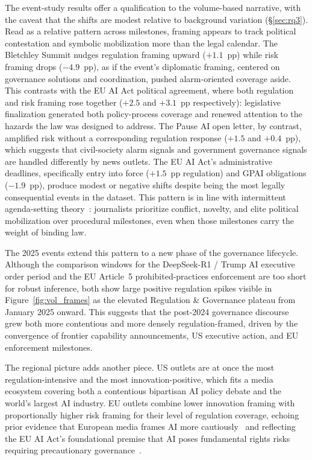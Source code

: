 \documentclass[sigconf]{acmart}
\begin{document}
The event-study results offer a qualification to the volume-based narrative, with the caveat that the shifts are modest relative to background variation (\S\ref{sec:rq3}).
Read as a relative pattern across milestones, framing appears to track political contestation and symbolic mobilization more than the legal calendar.
The Bletchley Summit nudges regulation framing upward ($+1.1$~pp) while risk framing drops ($-4.9$~pp), as if the event's diplomatic framing, centered on governance solutions and coordination, pushed alarm-oriented coverage aside.
This contrasts with the EU AI Act political agreement, where both regulation and risk framing rose together ($+2.5$ and $+3.1$~pp respectively): legislative finalization generated both policy-process coverage and renewed attention to the hazards the law was designed to address.
The Pause AI open letter, by contrast, amplified risk without a corresponding regulation response ($+1.5$ and $+0.4$~pp), which suggests that civil-society alarm signals and government governance signals are handled differently by news outlets.
The EU AI Act's administrative deadlines, specifically entry into force ($+1.5$~pp regulation) and GPAI obligations ($-1.9$~pp), produce modest or negative shifts despite being the most legally consequential events in the dataset.
This pattern is in line with intermittent agenda-setting theory~\cite{lazer_computational_2009}: journalists prioritize conflict, novelty, and elite political mobilization over procedural milestones, even when those milestones carry the weight of binding law.

The 2025 events extend this pattern to a new phase of the governance lifecycle.
Although the comparison windows for the DeepSeek-R1 / Trump AI executive order period and the EU Article~5 prohibited-practices enforcement are too short for robust inference, both show large positive regulation spikes visible in Figure~\ref{fig:vol_frames} as the elevated Regulation \& Governance plateau from January 2025 onward.
This suggests that the post-2024 governance discourse grew both more contentious and more densely regulation-framed, driven by the convergence of frontier capability announcements, US executive action, and EU enforcement milestones.

The regional picture adds another piece.
US outlets are at once the most regulation-intensive and the most innovation-positive, which fits a media ecosystem covering both a contentious bipartisan AI policy debate and the world's largest AI industry.
EU outlets combine lower innovation framing with proportionally higher risk framing for their level of regulation coverage, echoing prior evidence that European media frames AI more cautiously~\cite{nguyen_generative_2026} and reflecting the EU AI Act's foundational premise that AI poses fundamental rights risks requiring precautionary governance~\cite{gstrein_general-purpose_2024}.
\end{document}
